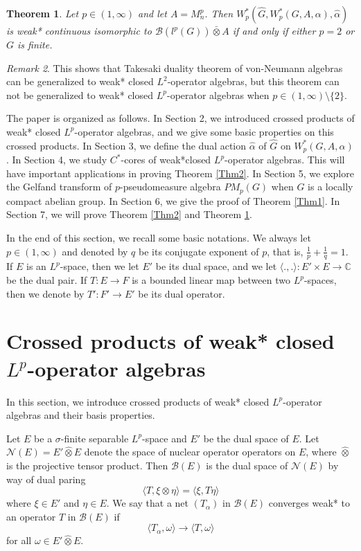 \documentclass[reqno,11pt]{amsart}
\theoremstyle{plain}
\newtheorem{thm}{Theorem}[section]
\theoremstyle{definition}
\theoremstyle{remark}
\newtheorem{rmk}[thm]{Remark}
\newcommand{\la}{\langle}
\newcommand{\ra}{\rangle}
\begin{document}
\begin{thm}\label{Thm3}
Let $p\in (1,\infty)$ and let $A=M_n^p$. Then $W^*_p(\hat{G},W^*_p(G,A,\alpha),\hat{\alpha})$ is weak* continuous isomorphic to $\mathcal{B}(l^p(G))\bar{\otimes} A$ if and only if either $p=2$ or $G$ is finite.
\end{thm}

\begin{rmk} This shows that  Takesaki duality theorem of von-Neumann algebras can be generalized to weak* closed $L^2$-operator algebras, but this theorem can not be generalized to  weak* closed $L^p$-operator algebras when $p\in (1,\infty)\setminus\{2\}$.
\end{rmk}

The paper is organized as follows.
In Section 2, we introduced crossed products of weak* closed $L^p$-operator algebras, and we give some basic properties on this crossed products.
In Section 3, we define the dual action $\hat{\alpha}$ of $\widehat{G}$ on $W^*_p(G,A,\alpha)$. In Section 4, we study $C^*$-cores of weak*closed $L^p$-operator algebras. This will have important applications in proving Theorem \ref{Thm2}. In Section 5, we explore the Gelfand transform of $p$-pseudomeasure algebra $PM_p(G)$ when $G$ is a locally compact abelian group. In Section 6, we give the proof of Theorem \ref{Thm1}. In Section 7, we will prove Theorem \ref{Thm2} and Theorem \ref{Thm3}.

In the end of this section, we recall some basic notations. We always let $p\in (1,\infty)$ and denoted by $q$ be its conjugate exponent
of $p$, that is, $\frac{1}{p}+\frac{1}{q}=1$. If $E$ is an $L^p$-space, then we let $E'$ be its dual space, and we let $\la .,.\ra:E'\times E\rightarrow \mathbb{C}$ be the dual pair.
If $T:E\rightarrow F$ is a bounded linear map between two $L^p$-spaces, then we denote by $T':F'\rightarrow E'$ be its dual operator.

\section{Crossed products of weak* closed $L^p$-operator algebras}\label{crossed}
In this section, we introduce crossed products of weak* closed $L^p$-operator algebras and their basis properties.

Let $E$ be a $\sigma$-finite separable $L^p$-space and $E'$ be the dual space of $E$.
Let $\mathcal{N}(E)=E'\widehat{\otimes}E$ denote the space of nuclear operator operators on $E$, where $\widehat{\otimes}$ is the projective tensor product. Then $\mathcal{B}(E)$ is the dual space of $\mathcal{N}(E)$ by way of dual paring $$\la T,\xi\otimes \eta\ra=\la\xi,T\eta\ra$$ where $\xi\in E'$ and $\eta\in E$.
We say that a net $(T_\alpha)$ in $\mathcal{B}(E)$ converges weak* to an operator $T$ in $\mathcal{B}(E)$ if $$\la T_\alpha,\omega\ra\rightarrow \la T,\omega\ra $$ for all $\omega\in E'\widehat{\otimes} E$.
\end{document}
